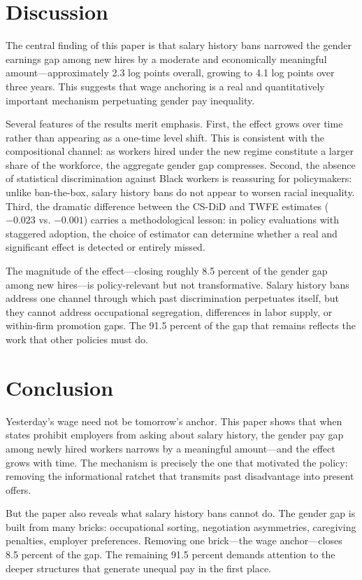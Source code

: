 \documentclass[12pt]{article}
\begin{document}
\section{Discussion}

The central finding of this paper is that salary history bans narrowed the gender earnings gap among new hires by a moderate and economically meaningful amount---approximately 2.3 log points overall, growing to 4.1 log points over three years. This suggests that wage anchoring is a real and quantitatively important mechanism perpetuating gender pay inequality.

Several features of the results merit emphasis. First, the effect grows over time rather than appearing as a one-time level shift. This is consistent with the compositional channel: as workers hired under the new regime constitute a larger share of the workforce, the aggregate gender gap compresses. Second, the absence of statistical discrimination against Black workers is reassuring for policymakers: unlike ban-the-box, salary history bans do not appear to worsen racial inequality. Third, the dramatic difference between the CS-DiD and TWFE estimates ($-0.023$ vs. $-0.001$) carries a methodological lesson: in policy evaluations with staggered adoption, the choice of estimator can determine whether a real and significant effect is detected or entirely missed.

The magnitude of the effect---closing roughly 8.5 percent of the gender gap among new hires---is policy-relevant but not transformative. Salary history bans address one channel through which past discrimination perpetuates itself, but they cannot address occupational segregation, differences in labor supply, or within-firm promotion gaps. The 91.5 percent of the gap that remains reflects the work that other policies must do.


\section{Conclusion}

Yesterday's wage need not be tomorrow's anchor. This paper shows that when states prohibit employers from asking about salary history, the gender pay gap among newly hired workers narrows by a meaningful amount---and the effect grows with time. The mechanism is precisely the one that motivated the policy: removing the informational ratchet that transmits past disadvantage into present offers.

But the paper also reveals what salary history bans cannot do. The gender gap is built from many bricks: occupational sorting, negotiation asymmetries, caregiving penalties, employer preferences. Removing one brick---the wage anchor---closes 8.5 percent of the gap. The remaining 91.5 percent demands attention to the deeper structures that generate unequal pay in the first place.
\end{document}

